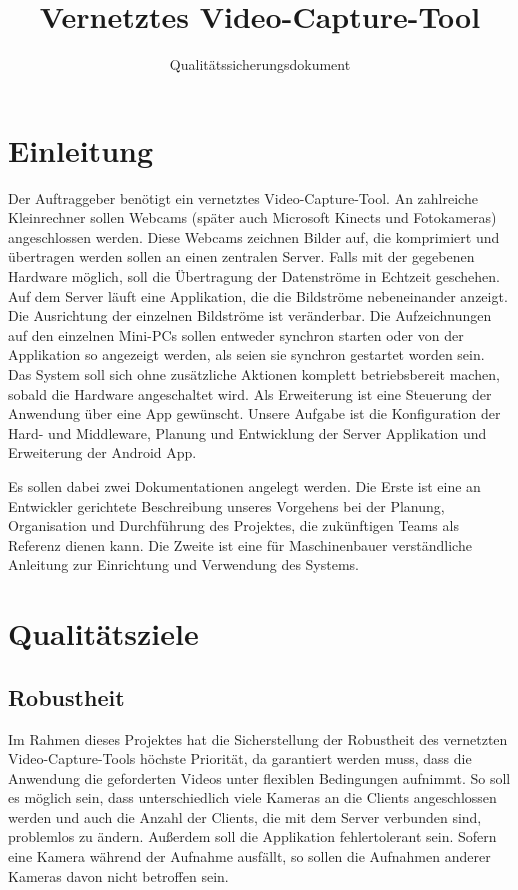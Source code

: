 \documentclass[accentcolor=tud0b,12pt,paper=a4]{tudreport}
\title{Vernetztes Video-Capture-Tool}
\subtitle{Qualitätssicherungsdokument}
\begin{document}
	\maketitle
	\tableofcontents 
	
	\chapter{Einleitung}
    Der Auftraggeber benötigt ein vernetztes Video-Capture-Tool. An zahlreiche Kleinrechner sollen Webcams (später auch Microsoft Kinects und Fotokameras) angeschlossen werden. Diese Webcams zeichnen Bilder auf, die komprimiert und übertragen werden sollen an einen zentralen Server. Falls mit der gegebenen Hardware möglich, soll die Übertragung der Datenströme in Echtzeit geschehen. Auf dem Server läuft eine Applikation, die die Bildströme nebeneinander anzeigt. Die Ausrichtung der einzelnen Bildströme ist veränderbar. Die Aufzeichnungen auf den einzelnen Mini-PCs sollen entweder synchron starten oder von der Applikation so angezeigt werden, als seien sie synchron gestartet worden sein. Das System soll sich ohne zusätzliche Aktionen komplett betriebsbereit machen, sobald die Hardware angeschaltet wird. Als Erweiterung ist eine Steuerung der Anwendung über eine App gewünscht. Unsere Aufgabe ist die Konfiguration der Hard- und Middleware, Planung und Entwicklung der Server Applikation und Erweiterung der Android App.

    Es sollen dabei zwei Dokumentationen angelegt werden. Die Erste ist eine an Entwickler gerichtete Beschreibung unseres Vorgehens bei der Planung, Organisation und Durchführung des Projektes, die zukünftigen Teams als Referenz dienen kann. Die Zweite ist eine für Maschinenbauer verständliche Anleitung zur Einrichtung und Verwendung des Systems.

	
	\chapter{Qualitätsziele}
        \section{Robustheit}
          Im Rahmen dieses Projektes hat die Sicherstellung der Robustheit des vernetzten Video-Capture-Tools höchste Priorität, da garantiert werden muss, dass die Anwendung die geforderten Videos unter flexiblen Bedingungen aufnimmt. So soll es möglich sein, dass unterschiedlich viele Kameras an die Clients angeschlossen werden und auch die Anzahl der Clients, die mit dem Server verbunden sind, problemlos zu ändern. Außerdem soll die Applikation fehlertolerant sein. Sofern eine Kamera während der Aufnahme ausfällt, so sollen die Aufnahmen anderer Kameras davon nicht betroffen sein.
\end{document}
